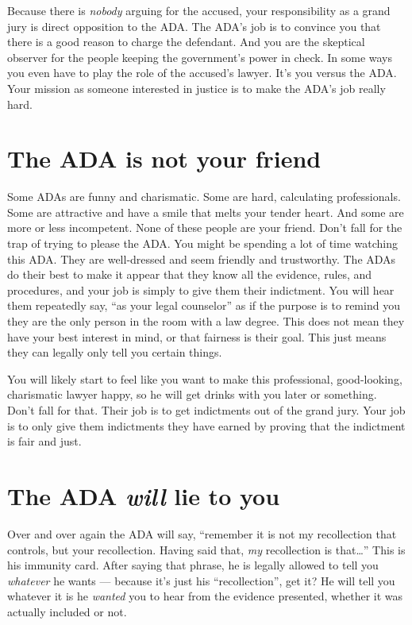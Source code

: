 \documentclass[letterpaper]{article}
\begin{document}
Because there is \emph{nobody} arguing for the accused, your responsibility as a grand jury is direct opposition to the ADA.
The ADA's job is to convince you that there is a good reason to charge the defendant.
And you are the skeptical observer for the people keeping the government's power in check.
In some ways you even have to play the role of the accused's lawyer.
It's you versus the ADA. 
Your mission as someone interested in justice is to make the ADA's job really hard.

\section*{The ADA is not your friend}
Some ADAs are funny and charismatic. 
Some are hard, calculating professionals. 
Some are attractive and have a smile that melts your tender heart. 
And some are more or less incompetent. 
None of these people are your friend. 
Don't fall for the trap of trying to please the ADA. 
You might be spending a lot of time watching this ADA.
They are well-dressed and seem friendly and trustworthy. 
The ADAs do their best to make it appear that they know all the evidence, rules, and procedures, and your job is simply to give them their indictment. 
You will hear them repeatedly say, ``as your legal counselor'' as if the purpose is to remind you they are the only person in the room with a law degree. 
This does not mean they have your best interest in mind, or that fairness is their goal. 
This just means they can legally only tell you certain things. 

You will likely start to feel like you want to make this professional, good-looking, charismatic lawyer happy, so he will get drinks with you later or something. 
Don't fall for that. 
Their job is to get indictments out of the grand jury. 
Your job is to only give them indictments they have earned by proving that the indictment is fair and just.

\section*{The ADA \emph{will} lie to you}
Over and over again the ADA will say, ``remember it is not my recollection that controls, but your recollection.  Having said that, \emph{my} recollection is that\ldots''
This is his immunity card. After saying that phrase, he is legally allowed to tell you \emph{whatever} he wants --- because it's just his ``recollection'', get it?
He will tell you whatever it is he \emph{wanted} you to hear from the evidence presented, whether it was actually included or not. 
\end{document}

